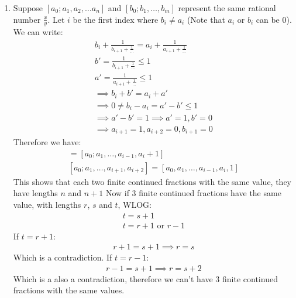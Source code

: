 \begin{enumerate}[label=\ilabel]
    \item 
        Suppose $[a_0; a_1, a_2, \dots a_n]$ and $[b_0; b_1, \dots, b_m]$ represent the same rational number $\frac{x}{y}$.
        Let $i$ be the first index where $b_i \ne a_i$ (Note that $a_i$ or $b_i$ can be 0). We can write:
        \begin{gather*}
            b_i + \frac{1}{b_{i + 1} + \frac{1}{\dots}} = a_i + \frac{1}{a_{i + 1} + \frac{1}{\dots}} \\
            b' = \frac{1}{b_{i + 1} + \frac{1}{\dots}} \le 1 \\
            a' = \frac{1}{a_{i + 1} + \frac{1}{\dots}} \le 1 \\
            \implies b_i + b' = a_i + a' \\
             \implies 0 \ne b_i - a_i = a' - b' \le 1 \\
             \implies a' - b' = 1 \implies a' = 1, b' = 0 \\
             \implies a_{i + 1} = 1, a_{i + 2} = 0, b_{i + 1} = 0
        \end{gather*}
        Therefore we have:
        \begin{gather*}
            [b_0; b_1, \dots, b_i, b_{i + 1}] = [a_0; a_1, \dots, a_{i - 1}, a_i + 1] \\
            [a_0; a_1, \dots, a_{i + 1}, a_{i + 2}] = [a_0, a_1, \dots, a_{i - 1}, a_i, 1]
        \end{gather*}
        This shows that each two finite continued fractions with the same value, they have lengths $n$ and $n + 1$
        Now if 3 finite continued fractions have the same value, with lengths $r$, $s$ and $t$, WLOG:
        \begin{gather*}
            t = s + 1 \\
            t = r + 1 \text{ or } r - 1
        \end{gather*}
        If $t = r + 1$:
        \begin{gather*}
            r + 1 = s + 1 \implies r = s 
        \end{gather*}
        Which is a contradiction. If $t = r - 1$:
        \begin{gather*}
            r - 1 = s + 1 \implies r = s + 2
        \end{gather*}
        Which is a also a contradiction, therefore we can't have 3 finite continued fractions with the same values.
\end{enumerate}
